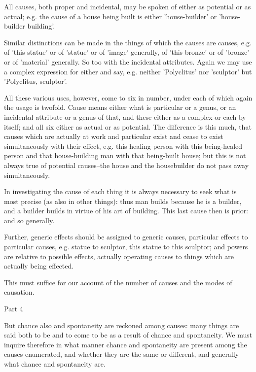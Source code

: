 All causes, both proper and incidental, may be spoken of either as
potential or as actual; e.g. the cause of a house being built is either
'house-builder' or 'house-builder building'. 

Similar distinctions can be made in the things of which the causes
are causes, e.g. of 'this statue' or of 'statue' or of 'image' generally,
of 'this bronze' or of 'bronze' or of 'material' generally. So too
with the incidental attributes. Again we may use a complex expression
for either and say, e.g. neither 'Polyclitus' nor 'sculptor' but 'Polyclitus,
sculptor'. 

All these various uses, however, come to six in number, under each
of which again the usage is twofold. Cause means either what is particular
or a genus, or an incidental attribute or a genus of that, and these
either as a complex or each by itself; and all six either as actual
or as potential. The difference is this much, that causes which are
actually at work and particular exist and cease to exist simultaneously
with their effect, e.g. this healing person with this being-healed
person and that house-building man with that being-built house; but
this is not always true of potential causes--the house and the housebuilder
do not pass away simultaneously. 

In investigating the cause of each thing it is always necessary to
seek what is most precise (as also in other things): thus man builds
because he is a builder, and a builder builds in virtue of his art
of building. This last cause then is prior: and so generally.

Further, generic effects should be assigned to generic causes, particular
effects to particular causes, e.g. statue to sculptor, this statue
to this sculptor; and powers are relative to possible effects, actually
operating causes to things which are actually being effected.

This must suffice for our account of the number of causes and the
modes of causation. 

Part 4

But chance also and spontaneity are reckoned among causes: many things
are said both to be and to come to be as a result of chance and spontaneity.
We must inquire therefore in what manner chance and spontaneity are
present among the causes enumerated, and whether they are the same
or different, and generally what chance and spontaneity are.

